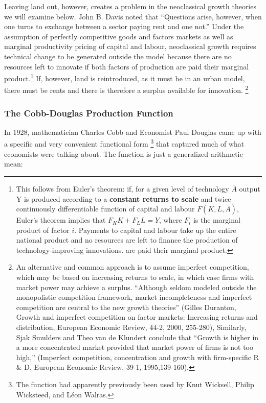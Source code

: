 
Leaving land out, however, creates a problem in  the neoclassical growth theories we will examine below. John B. Davis \cite{davisRicardoTheoryProfit1993} noted that ``Questions arise, however, when one turns to exchange between a sector paying rent and one not.'' 
Under the assumption of perfectly competitive goods and factors markets as well as marginal productivity pricing of capital and labour, neoclassical growth requires technical change to be generated outside the model because there are no resources left to innovate if both factors of production are paid their marginal product.\footnote{This follows from Euler’s theorem: if, for a given level of technology $\bar A$ output Y is produced according to a \textbf{constant returns to scale} and twice continuously differentiable function of capital and labour $F(K, L, \bar A)$, Euler’s theorem implies that $F_K K + F_L L=Y$, where $F_i$ is the marginal product of factor $i$. Payments to  capital and labour take up the entire national product and no resources are left to finance the production of technology-improving innovations. are paid their marginal product.} 
If, however, land is reintroduced, as it must be in an urban model, there must be rents and there is therefore a surplus available for innovation.
\footnote{An alternative and common approach is to assume imperfect competition, which may be based on increasing returns to scale, in which case firms with market power may achieve a surplus. ``Although seldom modeled outside the monopolistic competition framework, market incompleteness and imperfect competition are central to the new growth theories'' (Gilles Duranton, Growth and imperfect competition on factor markets: Increasing returns and distribution, European Economic Review, 44-2, 2000, 255-280), Similarly, Sjak Smulders and Theo van de Klundert conclude that ``Growth is higher in a more concentrated market provided that market power of firms is not too high,'' (Imperfect competition, concentration and growth with firm-specific R \& D, European Economic Review, 39-1, 1995,139-160).}

\subsubsection{The Cobb-Douglas Production Function}

In 1928, mathematician Charles Cobb and Economist Paul Douglas came up with a specific and very convenient functional form \cite{cobbTheoryProduction1928}\footnote{The function had apparently previously been used by Knut Wicksell, Philip Wicksteed, and L\'eon Walras.} that captured much of what economists were talking about. The function is just a generalized arithmetic mean:
 
